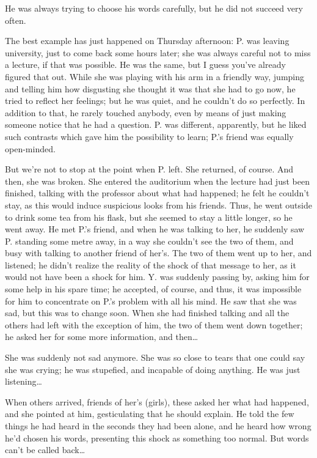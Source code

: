He was always trying to choose his words carefully, but he did not succeed very often.

The best example has just happened on Thursday afternoon: P. was leaving university, just to come back some hours later; she was always careful not to miss a lecture, if that was possible. He was the same, but I guess you've already figured that out. While she was playing with his arm in a friendly way, jumping and telling him how disgusting she thought it was that she had to go now, he tried to reflect her feelings; but he was quiet, and he couldn't do so perfectly. In addition to that, he rarely touched anybody, even by means of just making someone notice that he had a question. P. was different, apparently, but he liked such contrasts which gave him the possibility to learn; P.'s friend was equally open-minded.

But we're not to stop at the point when P. left. She returned, of course. And then, she was broken. She entered the auditorium when the lecture had just been finished, talking with the professor about what had happened; he felt he couldn't stay, as this would induce suspicious looks from his friends. Thus, he went outside to drink some tea from his flask, but she seemed to stay a little longer, so he went away. He met P.'s friend, and when he was talking to her, he suddenly saw P. standing some metre away, in a way she couldn't see the two of them, and busy with talking to another friend of her's. The two of them went up to her, and listened; he didn't realize the reality of the shock of that message to her, as it would not have been a shock for him. Y. was suddenly passing by, asking him for some help in his spare time; he accepted, of course, and thus, it was impossible for him to concentrate on P.'s problem with all his mind. He saw that she was sad, but this was to change soon. When she had finished talking and all the others had left with the exception of him, the two of them went down together; he asked her for some more information, and then\ldots

She was suddenly not sad anymore. She was so close to tears that one could say she was crying; he was stupefied, and incapable of doing anything. He was just listening\ldots

When others arrived, friends of her's (girls), these asked her what had happened, and she pointed at him, gesticulating that he should explain. He told the few things he had heard in the seconds they had been alone, and he heard how wrong he'd chosen his words, presenting this shock as something too normal. But words can't be called back\ldots

